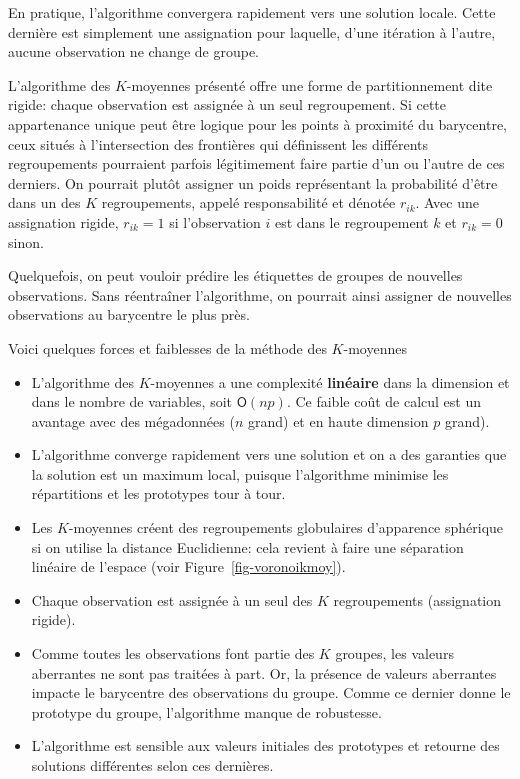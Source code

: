 \documentclass[
  11pt,
  letterpaper,
]{book}
\providecommand{\tightlist}{%
  \setlength{\itemsep}{0pt}\setlength{\parskip}{0pt}}\usepackage{longtable,booktabs,array}
\theoremstyle{definition}
\theoremstyle{remark}
\begin{document}
En pratique, l'algorithme convergera rapidement vers une solution
locale. Cette dernière est simplement une assignation pour laquelle,
d'une itération à l'autre, aucune observation ne change de groupe.

L'algorithme des \(K\)-moyennes présenté offre une forme de
partitionnement dite rigide: chaque observation est assignée à un seul
regroupement. Si cette appartenance unique peut être logique pour les
points à proximité du barycentre, ceux situés à l'intersection des
frontières qui définissent les différents regroupements pourraient
parfois légitimement faire partie d'un ou l'autre de ces derniers. On
pourrait plutôt assigner un poids représentant la probabilité d'être
dans un des \(K\) regroupements, appelé responsabilité et dénotée
\(r_{ik}\). Avec une assignation rigide, \(r_{ik}=1\) si l'observation
\(i\) est dans le regroupement \(k\) et \(r_{ik}=0\) sinon.

Quelquefois, on peut vouloir prédire les étiquettes de groupes de
nouvelles observations. Sans réentraîner l'algorithme, on pourrait ainsi
assigner de nouvelles observations au barycentre le plus près.

Voici quelques forces et faiblesses de la méthode des \(K\)-moyennes

\begin{itemize}
\tightlist
\item
  L'algorithme des \(K\)-moyennes a une complexité \textbf{linéaire}
  dans la dimension et dans le nombre de variables, soit
  \(\mathsf{O}(np)\). Ce faible coût de calcul est un avantage avec des
  mégadonnées (\(n\) grand) et en haute dimension \(p\) grand).
\item
  L'algorithme converge rapidement vers une solution et on a des
  garanties que la solution est un maximum local, puisque l'algorithme
  minimise les répartitions et les prototypes tour à tour.
\item
  Les \(K\)-moyennes créent des regroupements globulaires d'apparence
  sphérique si on utilise la distance Euclidienne: cela revient à faire
  une séparation linéaire de l'espace (voir
  Figure~\ref{fig-voronoikmoy}).
\item
  Chaque observation est assignée à un seul des \(K\) regroupements
  (assignation rigide).
\item
  Comme toutes les observations font partie des \(K\) groupes, les
  valeurs aberrantes ne sont pas traitées à part. Or, la présence de
  valeurs aberrantes impacte le barycentre des observations du groupe.
  Comme ce dernier donne le prototype du groupe, l'algorithme manque de
  robustesse.
\item
  L'algorithme est sensible aux valeurs initiales des prototypes et
  retourne des solutions différentes selon ces dernières.
\end{itemize}
\end{document}
